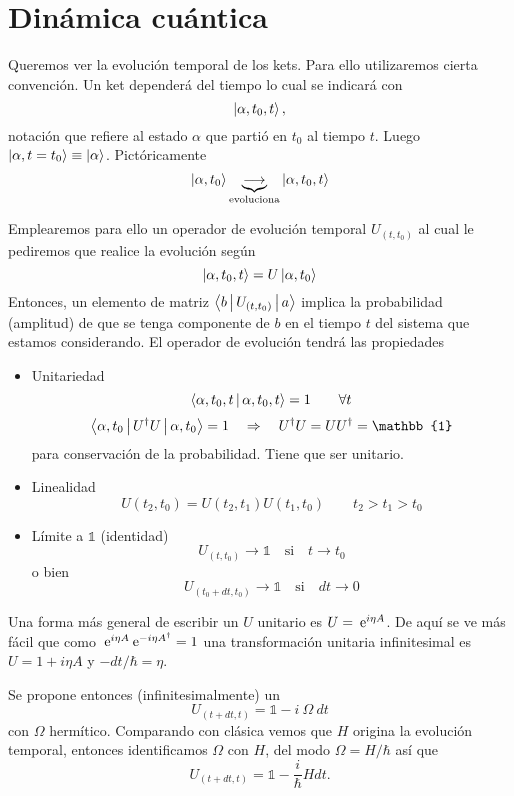 \documentclass[10pt,oneside]{CBFT_book}
\begin{document}
\chapter{Dinámica cuántica}

Queremos ver la evolución temporal de los kets. Para ello utilizaremos cierta convención.
Un ket dependerá del tiempo lo cual se indicará con 
\[
	\Ket{\alpha,t_0,t},
\]
notación que refiere al estado $\alpha$ que partió en $t_0$ al tiempo $t$. 
Luego $\Ket{\alpha,t=t_0} \equiv \Ket{\alpha}$.
Pictóricamente
\[
	\Ket{\alpha,t_0} \underbrace{\longrightarrow}_{\text{evoluciona}} \Ket{\alpha,t_0,t}
\]

Emplearemos para ello un operador de evolución temporal $U_{(t,t_0)}$ al cual le pediremos
que realice la evolución según
\[
	\Ket{\alpha,t_0,t} = U \Ket{\alpha,t_0}
\]
Entonces, un elemento de matriz $\Braket{b|U_{(t,t_0)}|a}$ implica la probabilidad (amplitud)
de que se tenga componente de $b$ en el tiempo $t$ del sistema que estamos considerando.
El operador de evolución tendrá las propiedades

\begin{itemize}
 \item Unitariedad
 \[
	\Braket{ \alpha,t_0,t| \alpha,t_0,t} = 1 \qquad \forall t
 \]
 \[
	\Braket{ \alpha,t_0| U^\dagger U| \alpha,t_0} = 1 \quad \Rightarrow \quad 
	U^\dagger U = U U^\dagger = \mathbb{1}
 \]
 para conservación de la probabilidad. Tiene que ser unitario.
 \item Linealidad
 \[
	U(t_2,t_0) = U(t_2,t_1) U(t_1,t_0) \qquad t_2>t_1>t_0
 \]
 \item Límite a $\mathbb{1}$ (identidad)
 \[
	U_{(t,t_0)} \to \mathbb{1} \quad \text{si} \quad t\to t_0
 \]
 o bien 
 \[
	U_{(t_0+dt,t_0)} \to \mathbb{1} \quad \text{si} \quad dt\to 0
 \]
\end{itemize}

Una forma más general de escribir un $U$ unitario es $U = \:\mathrm{e}^{i \eta A}$. De aquí se ve más fácil
que como $ \:\mathrm{e}^{i \eta A} \:\mathrm{e}^{-i \eta A^\dagger} = 1 $ una transformación unitaria infinitesimal es
$ U = 1 + i \eta A $ y $ - dt/\hbar = \eta $.

Se propone entonces (infinitesimalmente) un 
\[
	U_{(t+dt,t)} = \mathbb{1} - i \: \Omega \: dt 
\]
con $\Omega$ hermítico. Comparando con clásica vemos que $H$ origina la evolución temporal, entonces
identificamos $\Omega$ con $H$, del modo $\Omega = H/\hbar$ así que 
\[
	U_{(t+dt,t)} = \mathbb{1} - \frac{i}{\hbar} H dt .
\]
\end{document}
